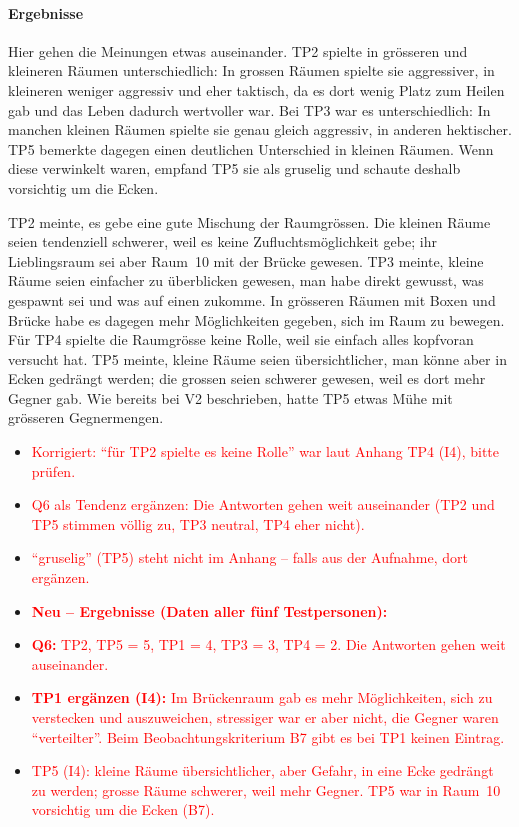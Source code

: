 \documentclass[../Main.tex]{subfiles}
\begin{document}
\paragraph{Ergebnisse}
Hier gehen die Meinungen etwas auseinander. TP2 spielte in grösseren und kleineren Räumen unterschiedlich: In grossen Räumen spielte sie aggressiver, in kleineren weniger aggressiv und eher taktisch, da es dort wenig Platz zum Heilen gab und das Leben dadurch wertvoller war. Bei TP3 war es unterschiedlich: In manchen kleinen Räumen spielte sie genau gleich aggressiv, in anderen hektischer. TP5 bemerkte dagegen einen deutlichen Unterschied in kleinen Räumen. Wenn diese verwinkelt waren, empfand TP5 sie als gruselig und schaute deshalb vorsichtig um die Ecken.

TP2 meinte, es gebe eine gute Mischung der Raumgrössen. Die kleinen Räume seien tendenziell schwerer, weil es keine Zufluchtsmöglichkeit gebe; ihr Lieblingsraum sei aber Raum~10 mit der Brücke gewesen. TP3 meinte, kleine Räume seien einfacher zu überblicken gewesen, man habe direkt gewusst, was gespawnt sei und was auf einen zukomme. In grösseren Räumen mit Boxen und Brücke habe es dagegen mehr Möglichkeiten gegeben, sich im Raum zu bewegen. Für TP4 spielte die Raumgrösse keine Rolle, weil sie einfach alles kopfvoran versucht hat. TP5 meinte, kleine Räume seien übersichtlicher, man könne aber in Ecken gedrängt werden; die grossen seien schwerer gewesen, weil es dort mehr Gegner gab. Wie bereits bei V2 beschrieben, hatte TP5 etwas Mühe mit grösseren Gegnermengen.

\begin{itemize}[leftmargin=1.5cm]
    \item \textcolor{red}{Korrigiert: \enquote{für TP2 spielte es keine Rolle} war laut Anhang TP4 (I4), bitte prüfen.}
    \item \textcolor{red}{Q6 als Tendenz ergänzen: Die Antworten gehen weit auseinander (TP2 und TP5 stimmen völlig zu, TP3 neutral, TP4 eher nicht).}
    \item \textcolor{red}{\enquote{gruselig} (TP5) steht nicht im Anhang -- falls aus der Aufnahme, dort ergänzen.}
\end{itemize}

\begin{itemize}[leftmargin=1.5cm]
    \item \textcolor{red}{\textbf{Neu -- Ergebnisse (Daten aller fünf Testpersonen):}}
    \item \textcolor{red}{\textbf{Q6:} TP2, TP5 = 5, TP1 = 4, TP3 = 3, TP4 = 2. Die Antworten gehen weit auseinander.}
    \item \textcolor{red}{\textbf{TP1 ergänzen (I4):} Im Brückenraum gab es mehr Möglichkeiten, sich zu verstecken und auszuweichen, stressiger war er aber nicht, die Gegner waren \enquote{verteilter}. Beim Beobachtungskriterium B7 gibt es bei TP1 keinen Eintrag.}
    \item \textcolor{red}{TP5 (I4): kleine Räume übersichtlicher, aber Gefahr, in eine Ecke gedrängt zu werden; grosse Räume schwerer, weil mehr Gegner. TP5 war in Raum~10 vorsichtig um die Ecken (B7).}
\end{itemize}
\end{document}
